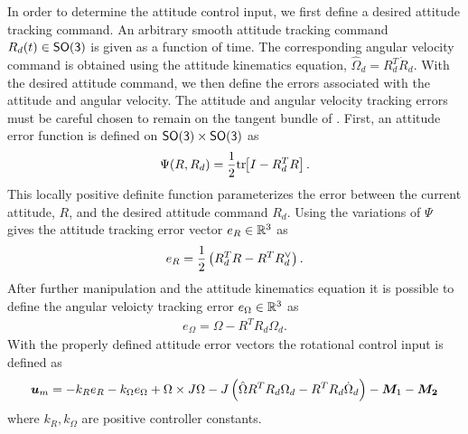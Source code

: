 \documentclass[letterpaper, paper,11pt]{AAS}		%
\begin{document}
In order to determine the attitude control input, we first define a desired attitude tracking command.
An arbitrary smooth attitude tracking command \( R_d (t) \in \mathsf{SO(3)} \) is given as a function of time.
The corresponding angular velocity command is obtained using the attitude kinematics equation, \( \hat{\Omega}_d = R_d^T \dot{R}_d \).
With the desired attitude command, we then define the errors associated with the attitude and angular velocity.
The attitude and angular velocity tracking errors must be careful chosen to remain on the tangent bundle of \SO.
First, an attitude error function is defined on \( \mathsf{SO(3)} \times \mathsf{SO(3)} \) as
\begin{align}\label{eq:attitude_error_function}
    \Psi(R, R_d) = \frac{1}{2} \mathrm{tr}\negthickspace\left[ I - R_d^T R \right].
\end{align}
This locally positive definite function parameterizes the error between the current attitude, \( R \), and the desired attitude command \( R_d \).
Using the variations of \( \Psi \) gives the attitude tracking error vector \( e_R \in \mathbb{R}^3 \) as
\begin{align}\label{eq:attitude_error_vector}
    e_R = \frac{1}{2} \left( R_d^T R - R^T R_d^\vee \right).
\end{align}
After further manipulation and the attitude kinematics equation it is possible to define the angular veloicty tracking error \( e_\Omega \in \mathbb{R}^3 \) as
\begin{align}\label{eq:angular_velocity_error_vector}
    e_\Omega = \Omega - R^T R_d \Omega_d .
\end{align}
With the properly defined attitude error vectors the rotational control input is defined as 
\begin{align*}\label{eq:rotational_control}
    \bm{u}_m = - k_R e_R - k_\Omega e_\Omega + \Omega \times J \Omega - J \left( \hat{\Omega} R^T R_d \Omega_d - R^T R_d \dot{\Omega}_d \right) - \bm{M}_1 - \bm{M_2} 
\end{align*}
where \( k_R, k_\Omega \) are positive controller constants.
\end{document}
